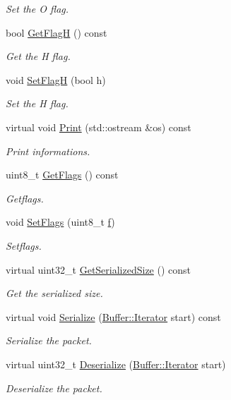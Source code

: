 \begin{DoxyCompactItemize}
\begin{DoxyCompactList}\small\item\em Set the O flag. \end{DoxyCompactList}\item 
bool \hyperlink{classns3_1_1Icmpv6RA_a2ba5ec0745cf3e8fda5dd8bcbbb33eb4}{Get\+FlagH} () const 
\begin{DoxyCompactList}\small\item\em Get the H flag. \end{DoxyCompactList}\item 
void \hyperlink{classns3_1_1Icmpv6RA_a4c3df0d2356b15dcbb5e003e1774a289}{Set\+FlagH} (bool h)
\begin{DoxyCompactList}\small\item\em Set the H flag. \end{DoxyCompactList}\item 
virtual void \hyperlink{classns3_1_1Icmpv6RA_a4da7781649df7aa9c067638fa7addb44}{Print} (std\+::ostream \&os) const 
\begin{DoxyCompactList}\small\item\em Print informations. \end{DoxyCompactList}\item 
uint8\+\_\+t \hyperlink{classns3_1_1Icmpv6RA_aa33f347be76acccf3214564850cf48f2}{Get\+Flags} () const 
\begin{DoxyCompactList}\small\item\em Getflags. \end{DoxyCompactList}\item 
void \hyperlink{classns3_1_1Icmpv6RA_a1625da27db1384e8994178cd5ecc8972}{Set\+Flags} (uint8\+\_\+t \hyperlink{80211b_8c_ae7ffc1a8f84fa47a0812b2f2b9627132}{f})
\begin{DoxyCompactList}\small\item\em Setflags. \end{DoxyCompactList}\item 
virtual uint32\+\_\+t \hyperlink{classns3_1_1Icmpv6RA_a6069fa968c68ef4642ed64100dac5aab}{Get\+Serialized\+Size} () const 
\begin{DoxyCompactList}\small\item\em Get the serialized size. \end{DoxyCompactList}\item 
virtual void \hyperlink{classns3_1_1Icmpv6RA_afc9c2386a4c11b13c41d79f0dbc970cd}{Serialize} (\hyperlink{classns3_1_1Buffer_1_1Iterator}{Buffer\+::\+Iterator} start) const 
\begin{DoxyCompactList}\small\item\em Serialize the packet. \end{DoxyCompactList}\item 
virtual uint32\+\_\+t \hyperlink{classns3_1_1Icmpv6RA_a91908412f051db52bd63b7a0d01c1117}{Deserialize} (\hyperlink{classns3_1_1Buffer_1_1Iterator}{Buffer\+::\+Iterator} start)
\begin{DoxyCompactList}\small\item\em Deserialize the packet. \end{DoxyCompactList}\end{DoxyCompactItemize}
